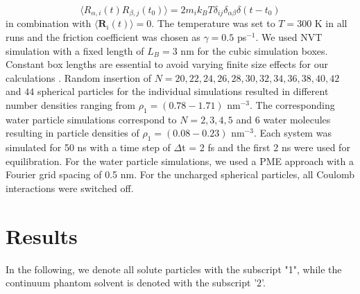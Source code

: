 \documentclass[aip,jcp,reprint]{revtex4-1}
\begin{document}
\begin{equation}
	\langle R_{\alpha,i}(t)R_{\beta,j}(t_0)\rangle = 2 m_i k_BT \delta_{ij}\delta_{\alpha\beta}\delta(t-t_0)
\end{equation}
in combination with  $\langle {\textbf{R}}_i(t)\rangle = 0 $. The temperature was set to $T=300$ K in all runs and the friction coefficient was chosen as $\gamma = 0.5$ ps$^{-1}$.
We used NVT simulation with a fixed length of $L_B = 3$ nm for the cubic simulation boxes. Constant box lengths are essential to avoid varying finite size effects for our calculations \cite{yeh04a}. Random insertion of $N=20, 22, 24, 26, 28, 30, 32,34,36, 38, 40, 42$ and $44$ spherical particles for the individual  simulations resulted in different number densities ranging from $\rho_1 =  (0.78 - 1.71)$ nm$^{-3}$. The corresponding water particle simulations correspond to $N = 2,3,4,5$ and 6 water molecules resulting in particle densities of $\rho_1 = (0.08 - 0.23)$ nm$^{-3}$. Each system was simulated for 50 ns with a time step of $\Delta$t = 2 fs and the first 2 ns were used for equilibration. For the water particle simulations, we used a PME approach \cite{darden93a} with a Fourier grid spacing of 0.5 nm. For the uncharged spherical particles, all Coulomb interactions were switched off.


\section{Results}
In the following, we denote all solute particles with the subscript "1", while the continuum phantom solvent is denoted with the subscript '2'.
\end{document}
